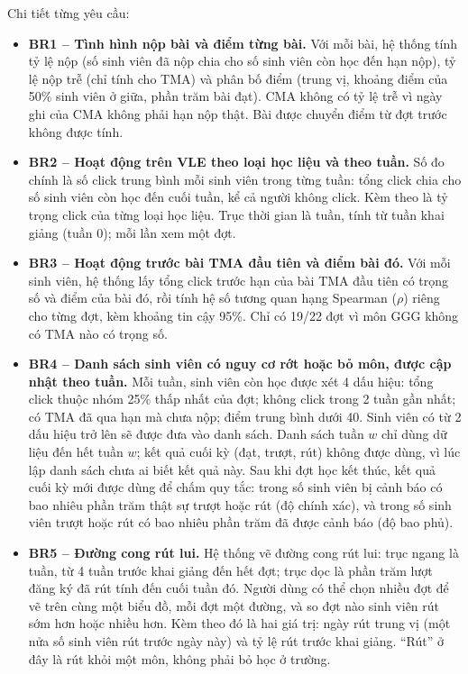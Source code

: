 Chi tiết từng yêu cầu:
\begin{itemize}
  \item \textbf{BR1 -- Tình hình nộp bài và điểm từng bài.} Với mỗi bài, hệ thống tính tỷ lệ nộp (số sinh viên đã nộp chia cho số sinh viên còn học
        đến hạn nộp), tỷ lệ nộp trễ (chỉ tính cho TMA) và phân bố điểm (trung vị, khoảng điểm
        của 50\% sinh viên ở giữa, phần trăm bài đạt). CMA không có tỷ lệ trễ vì ngày ghi của CMA
        không phải hạn nộp thật. Bài được chuyển điểm từ đợt trước không được tính.
  \item \textbf{BR2 -- Hoạt động trên VLE theo loại học liệu và theo tuần.} Số đo chính là số click trung bình mỗi sinh viên trong từng tuần: tổng click chia cho số
        sinh viên còn học đến cuối tuần, kể cả người không click. Kèm theo là tỷ trọng click của
        từng loại học liệu. Trục thời gian là tuần, tính từ tuần khai giảng (tuần 0); mỗi lần
        xem một đợt.
  \item \textbf{BR3 -- Hoạt động trước bài TMA đầu tiên và điểm bài đó.} Với mỗi sinh viên, hệ thống lấy tổng click trước hạn của bài TMA đầu tiên có trọng số và
        điểm của bài đó, rồi tính hệ số tương quan hạng Spearman ($\rho$) riêng cho từng đợt, kèm
        khoảng tin cậy 95\%. Chỉ có 19/22 đợt vì môn GGG không có TMA nào có trọng số.
  \item \textbf{BR4 -- Danh sách sinh viên có nguy cơ rớt hoặc bỏ môn, được cập nhật theo tuần.} Mỗi tuần, sinh viên còn học được xét 4 dấu hiệu: tổng click thuộc nhóm 25\% thấp nhất của
        đợt; không click trong 2 tuần gần nhất; có TMA đã qua hạn mà chưa nộp; điểm trung bình
        dưới 40. Sinh viên có từ 2 dấu hiệu trở lên sẽ được đưa vào danh sách. Danh sách tuần $w$ chỉ dùng dữ liệu đến hết tuần $w$; kết quả cuối kỳ (đạt, trượt, rút) không được dùng, vì lúc lập danh sách chưa ai biết kết quả này. Sau khi đợt học kết thúc, kết quả cuối kỳ mới được dùng để chấm quy tắc: trong số sinh viên bị cảnh báo có bao nhiêu phần trăm thật sự trượt hoặc rút (độ chính xác), và trong số sinh viên trượt hoặc rút có bao nhiêu phần trăm đã được cảnh báo (độ bao phủ).
  \item \textbf{BR5 -- Đường cong rút lui.} Hệ thống vẽ đường cong rút lui: trục ngang là tuần, từ 4 tuần trước khai giảng đến hết đợt; trục dọc là phần trăm lượt đăng ký đã rút tính đến cuối tuần đó. Người dùng có thể chọn nhiều đợt để vẽ trên cùng một biểu đồ, mỗi đợt một đường, và so đợt nào sinh viên rút sớm hơn hoặc nhiều hơn. Kèm theo đó là hai giá trị: ngày rút trung vị (một nửa số sinh viên rút trước ngày này) và tỷ lệ rút trước khai giảng. ``Rút'' ở đây là rút khỏi một môn, không phải bỏ học ở trường.

\end{itemize}
